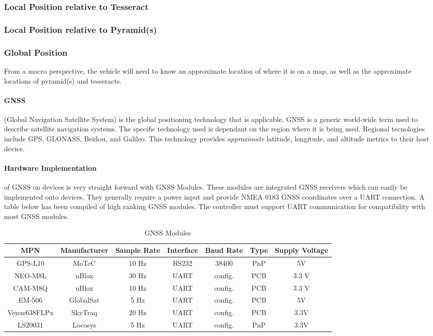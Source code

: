 \documentclass[12pt]{article}
\begin{document}
\subsubsection{Local Position relative to Tesseract}


\subsubsection{Local Position relative to Pyramid(s)}
\subsubsection{Global Position}
From a macro perspective, the vehicle will need to know an approximate location of where it is on a map, as well as the approximate locations of pyramid(s) and tesseracts. 

\paragraph{GNSS} (Global Navigation Satellite System) is the global positioning technology that is applicable. GNSS is a generic world-wide term used to describe satellite navigation systems. The specific technology used is dependant on the region where it is being used. Regional tecnologies include GPS, GLONASS, Beidou, and Galileo.  This technology provides \textit{approximate} latitude, longitude, and altitude metrics to their host device. 

\paragraph{Hardware Implementation} of GNSS on devices is very straight forward with GNSS Modules. These modules are integrated GNSS receivers which can easily be implemented onto devices. They generally require a power input and provide NMEA 0183 GNSS coordinates over a UART connection. A table below has been compiled of high ranking GNSS modules. The controller must support UART communication for compatibility with most GNSS modules.

\begin{table}[htbp]
  \centering
  \caption{GNSS Modules}
    \begin{tabular}{c|c|c|c|c|c|c}
    MPN   & Manufacturer & Sample Rate & Interface & Baud Rate & Type& Supply Voltage \\
    \midrule
    GPS-L10 & MoTeC & 10 Hz & RS232 & 38400 &     PnP  & 5V \\
    NEO-M8L & uBlox & 30 Hz & UART  & config. &    PCB   & 3.3 V \\
    CAM-M8Q & uBlox & 10 Hz & UART  & config. & PCB & 3.3 V \\
    EM-506 & GlobalSat & 5 Hz & UART  & config. & PCB & 5V \\
    Venus638FLPx & SkyTraq & 20 Hz & UART  & config. & PCB & 3.3V \\
    LS20031 & Locosys & 5 Hz  & UART  & config. & PnP & 3.3V \\
    \end{tabular}%
  \label{tab:addlabel}%
\end{table}%
\end{document}
